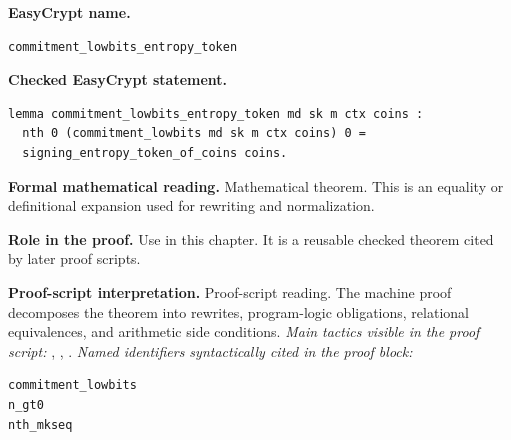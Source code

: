 \begin{formaltheorem}
\noindent\textbf{EasyCrypt name.}
\begin{lstlisting}[language=EasyCrypt,basicstyle=\ttfamily\scriptsize]
commitment_lowbits_entropy_token
\end{lstlisting}
\noindent\textbf{Checked EasyCrypt statement.}
\begin{lstlisting}[language=EasyCrypt,basicstyle=\ttfamily\scriptsize]
lemma commitment_lowbits_entropy_token md sk m ctx coins :
  nth 0 (commitment_lowbits md sk m ctx coins) 0 =
  signing_entropy_token_of_coins coins.
\end{lstlisting}
\noindent\textbf{Formal mathematical reading.}
Mathematical theorem. This is an equality or definitional expansion used for rewriting and normalization.

\noindent\textbf{Role in the proof.}
Use in this chapter. It is a reusable checked theorem cited by later proof scripts.

\noindent\textbf{Proof-script interpretation.}
Proof-script reading. The machine proof decomposes the theorem into rewrites, program-logic obligations, relational equivalences, and arithmetic side conditions.
\emph{Main tactics visible in the proof script:} , , .
\emph{Named identifiers syntactically cited in the proof block:}
\begin{lstlisting}[language=EasyCrypt,basicstyle=\ttfamily\scriptsize]
commitment_lowbits
n_gt0
nth_mkseq
\end{lstlisting}

\end{formaltheorem}

